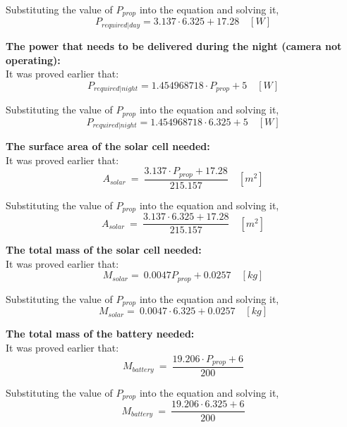 Substituting the value of $ P_{prop} $ into the equation and solving it, \[ P_{required|day} = 3.137 \cdot 6.325 + 17.28 \quad [W] \] \begin{center}  \end{center} \vspace{1cm} \p \textbf{The power that needs to be delivered during the night (camera not operating):} \vspace{0.1cm}\\ It was proved earlier that: \[ P_{required | night} = 1.454968718 \cdot P_{prop} + 5 \quad [W] \]

Substituting the value of $ P_{prop} $ into the equation and solving it, \[ P_{required | night} = 1.454968718 \cdot 6.325 + 5 \quad [W] \] \begin{center}  \end{center} \vspace{1cm} \p \textbf{The surface area of the solar cell needed:} \vspace{0.1cm}\\ It was proved earlier that: \[ A_{solar} \ = \ \frac{ 3.137 \cdot P_{prop} + 17.28 }{ 215.157 } \quad [m^2] \]

Substituting the value of $ P_{prop} $ into the equation and solving it, \[ A_{solar} \ = \ \frac{ 3.137 \cdot 6.325 + 17.28 }{ 215.157 } \quad [m^2] \] \begin{center}  \end{center} \vspace{1cm} \p \textbf{The total mass of the solar cell needed:} \vspace{0.1cm}\\ It was proved earlier that: \[ M_{solar} = \ 0.0047 P_{prop} + 0.0257  \quad [kg] \]

Substituting the value of $ P_{prop} $ into the equation and solving it, \[ M_{solar} = \ 0.0047 \cdot 6.325 + 0.0257  \quad [kg] \] \begin{center}  \end{center} \vspace{1cm} \p \textbf{The total mass of the battery needed:} \vspace{0.1cm}\\ It was proved earlier that: \[ M_{battery} \ = \ \frac{ 19.206 \cdot P_{prop} + 6 }{ 200 } \]

Substituting the value of $ P_{prop} $ into the equation and solving it, \[ M_{battery} \ = \ \frac{ 19.206 \cdot 6.325 + 6 }{ 200 } \] \begin{center}    \end{center}
